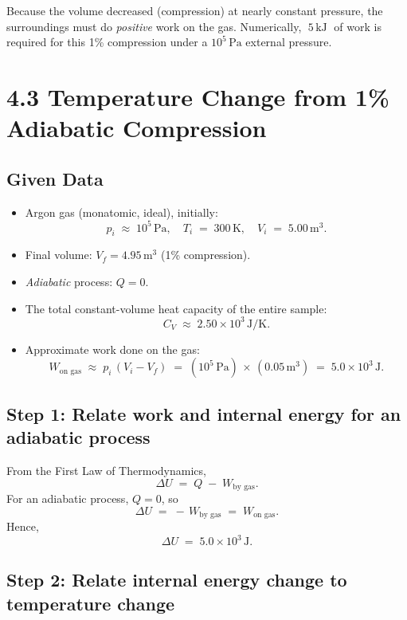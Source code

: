 \documentclass[12pt]{article}
\theoremstyle{definition} %
\theoremstyle{plain} %
\begin{document}
Because the volume decreased (compression) at nearly constant pressure, the surroundings must do \emph{positive} work on the gas. Numerically, $\;5\,\mathrm{kJ}\;$ of work is required for this 1\% compression under a $10^5\,\mathrm{Pa}$ external pressure.

\section*{4.3 Temperature Change from 1\% Adiabatic Compression}

\subsection*{Given Data}

\begin{itemize}
  \item Argon gas (monatomic, ideal), initially:
    \[
      p_i \;\approx\; 10^5\,\mathrm{Pa}, \quad
      T_i \;=\; 300\,\mathrm{K}, \quad
      V_i \;=\; 5.00\,\mathrm{m^3}.
    \]
  \item Final volume: $V_f = 4.95\,\mathrm{m^3}$ (1\% compression).
  \item \emph{Adiabatic} process: $Q=0$.
  \item The total constant-volume heat capacity of the entire sample:
    \[
      C_V \;\approx\; 2.50 \times 10^3\,\mathrm{J/K}.
    \]
  \item Approximate work done on the gas:
    \[
      W_{\text{on gas}} 
      \;\approx\;
      p_i\,(V_i - V_f)
      \;=\;
      (10^5\,\mathrm{Pa}) \,\times\, (0.05\,\mathrm{m^3})
      \;=\;
      5.0 \times 10^3\,\mathrm{J}.
    \]
\end{itemize}

\subsection*{Step 1: Relate work and internal energy for an adiabatic process}

From the First Law of Thermodynamics,
\[
\Delta U 
\;=\;
Q \;-\; W_{\text{by gas}}.
\]
For an adiabatic process, $Q=0$, so
\[
\Delta U
\;=\;
-\,W_{\text{by gas}}
\;=\;
W_{\text{on gas}}.
\]
Hence,
\[
\Delta U
\;=\;
5.0 \times 10^3\,\mathrm{J}.
\]

\subsection*{Step 2: Relate internal energy change to temperature change}
\end{document}
